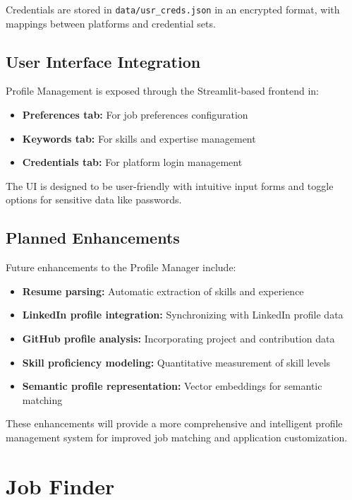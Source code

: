 \documentclass[a4paper,12pt]{article}
\begin{document}
Credentials are stored in \texttt{data/usr\_creds.json} in an encrypted format, with mappings between platforms and credential sets.

\subsection{User Interface Integration}
Profile Management is exposed through the Streamlit-based frontend in:

\begin{itemize}
    \item \textbf{Preferences tab:} For job preferences configuration
    \item \textbf{Keywords tab:} For skills and expertise management
    \item \textbf{Credentials tab:} For platform login management
\end{itemize}

The UI is designed to be user-friendly with intuitive input forms and toggle options for sensitive data like passwords.

\subsection{Planned Enhancements}
Future enhancements to the Profile Manager include:

\begin{itemize}
    \item \textbf{Resume parsing:} Automatic extraction of skills and experience
    \item \textbf{LinkedIn profile integration:} Synchronizing with LinkedIn profile data
    \item \textbf{GitHub profile analysis:} Incorporating project and contribution data
    \item \textbf{Skill proficiency modeling:} Quantitative measurement of skill levels
    \item \textbf{Semantic profile representation:} Vector embeddings for semantic matching
\end{itemize}

These enhancements will provide a more comprehensive and intelligent profile management system for improved job matching and application customization.

\newpage



\section{Job Finder}
\end{document}

